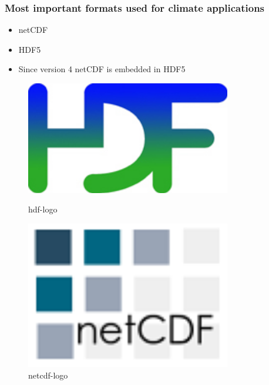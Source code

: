 \documentclass[compress]{beamer}
\begin{document}
\begin{frame}[fragile]
	\frametitle{Most important formats used for climate applications}

		\begin{itemize}
			\item netCDF
			\item HDF5
			\item Since version 4 netCDF is embedded in HDF5
		\end{itemize}
	
  \begin{figure}[htbp]
    \begin{minipage}{0.35\textwidth}
     \centering
      \includegraphics[width=0.8\textwidth]{gfx/hdf.jpg}
      \caption{hdf-logo \cite{hdf}}
    \end{minipage}\hfill
    \begin{minipage}{0.35\textwidth}
     \centering
      \includegraphics[width=0.8\textwidth]{gfx/netcdf.png}
      \caption{netcdf-logo \cite{netcdf}}
    \end{minipage}
  \end{figure}
	
\end{frame}
\end{document}
